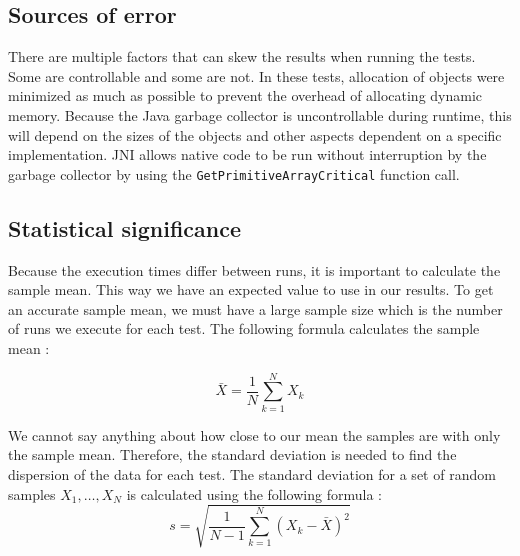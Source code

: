 \subsection{Sources of error}
There are multiple factors that can skew the results when running the tests. Some are controllable and some are not. In these tests, allocation of objects were minimized as much as possible to prevent the overhead of allocating dynamic memory. Because the Java garbage collector is uncontrollable during runtime, this will depend on the sizes of the objects and other aspects dependent on a specific implementation. JNI allows native code to be run without interruption by the garbage collector by using the \texttt{GetPrimitiveArrayCritical} function call. 


\subsection{Statistical significance}
Because the execution times differ between runs, it is important to calculate the sample mean. This way we have an expected value to use in our results. To get an accurate sample mean, we must have a large sample size which is the number of runs we execute for each test. The following formula calculates the sample mean \cite[p.263]{olofsson2012probability}:

\begin{equation*}
    \bar{X} = \frac{1}{N} \sum\limits_{k = 1}^{N} X_k
\end{equation*}

We cannot say anything about how close to our mean the samples are with only the sample mean. Therefore, the standard deviation is needed to find the dispersion of the data for each test. The standard deviation for a set of random samples $X_1, \dots, X_N$ is calculated using the following formula \cite[p.~302]{olofsson2012probability}:
\begin{equation*}
    s = \sqrt{\frac{1}{N - 1} \sum\limits_{k = 1}^{N}\left(X_k - \bar{X}\right)^2}
\end{equation*}


